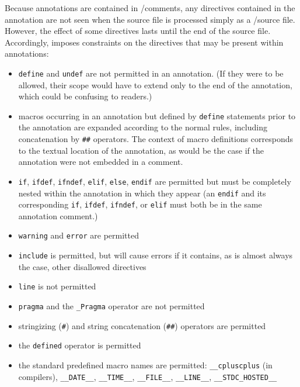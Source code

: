 Because \acslb annotations are contained in \C/\cpp comments,
any directives contained in the annotation are not seen when the source file is processed simply as a \C/\cpp source file. However, the effect of some directives lasts until the end of the source file. 
Accordingly, \acslpp imposes constraints on the directives that may be present within annotations:
\begin{itemize}
        \item \texttt{define} and \texttt{undef} are not permitted in an annotation. (If they were to be allowed, their scope would have to extend only to the end of the annotation, which could be confusing to readers.)
        \item macros occurring in an annotation but defined by \texttt{define} statements prior to the annotation are expanded according to the normal rules, including concatenation by \texttt{\#\#} operators.
        The context of macro definitions corresponds to the textual location of the annotation, as would be the case if the
        annotation were not embedded in a comment.
        \item \texttt{if}, \texttt{ifdef}, \texttt{ifndef}, \texttt{elif}, \texttt{else}, \texttt{endif} are permitted but must be completely nested within the annotation in which they appear (an \texttt{endif} and its corresponding \texttt{if}, \texttt{ifdef}, \texttt{ifndef}, or \texttt{elif} must both be in the same annotation comment.)
        \item \texttt{warning} and \texttt{error} are permitted
        \item \texttt{include} is permitted, but will cause errors if it contains, as is almost always the case, other disallowed directives
        \item \texttt{line} is not permitted
        \item \texttt{pragma} and the \texttt{\_Pragma} operator are not permitted
        \item stringizing (\verb|#|) and string concatenation (\verb|##|) operators are permitted
        \item the \verb|defined| operator is permitted
        \item the standard predefined macro names are permitted:
        \texttt{\_\_cpluscplus} (in \cpp compilers),
        \texttt{\_\_DATE\_\_},
    \texttt{\_\_TIME\_\_},
        \texttt{\_\_FILE\_\_},
        \texttt{\_\_LINE\_\_},
        \texttt{\_\_STDC\_HOSTED\_\_}
\end{itemize}

